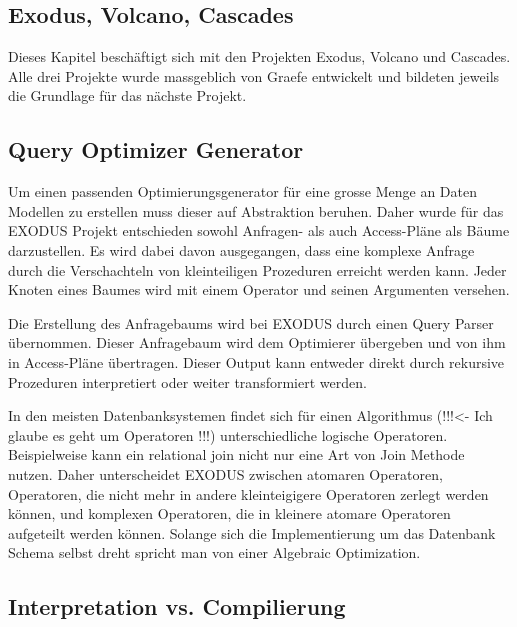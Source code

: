 \subsection{Exodus, Volcano, Cascades}
Dieses Kapitel beschäftigt sich mit den Projekten Exodus, Volcano und Cascades. Alle drei Projekte wurde massgeblich von Graefe entwickelt und bildeten jeweils die Grundlage für das nächste Projekt.



\subsection{Query Optimizer Generator}
Um einen passenden Optimierungsgenerator für eine grosse Menge an Daten Modellen zu erstellen muss dieser auf Abstraktion beruhen. Daher wurde für das EXODUS Projekt entschieden sowohl Anfragen- als auch Access-Pläne als Bäume darzustellen. Es wird dabei davon ausgegangen, dass eine komplexe Anfrage durch die Verschachteln von kleinteiligen Prozeduren erreicht werden kann. Jeder Knoten eines Baumes wird mit einem Operator und seinen Argumenten versehen.

Die Erstellung des Anfragebaums wird bei EXODUS durch einen Query Parser übernommen. Dieser Anfragebaum wird dem Optimierer übergeben und von ihm in Access-Pläne übertragen. Dieser Output kann entweder direkt durch rekursive Prozeduren interpretiert oder weiter transformiert werden.

In den meisten Datenbanksystemen findet sich für einen Algorithmus (!!!<- Ich glaube es geht um Operatoren !!!) unterschiedliche logische Operatoren. Beispielweise kann ein relational join nicht nur eine Art von Join Methode nutzen. Daher unterscheidet EXODUS zwischen atomaren Operatoren, Operatoren, die nicht mehr in andere kleinteigigere Operatoren zerlegt werden können, und komplexen Operatoren, die in kleinere atomare Operatoren aufgeteilt werden können. Solange sich die Implementierung um das Datenbank Schema selbst dreht spricht man von einer Algebraic Optimization.

\subsection{Interpretation vs. Compilierung}

